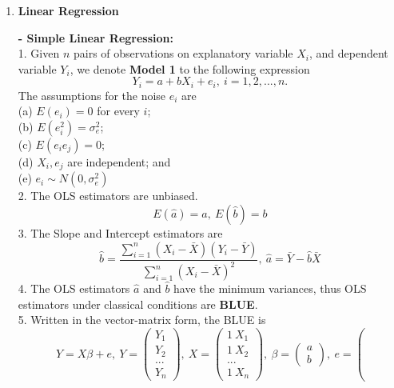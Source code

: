 \documentclass{article}
\begin{document}
\begin{enumerate}[S1 - ]
    \item \textbf{Linear Regression}\\\par
    \textbf{- Simple Linear Regression:}\\
    1. Given $n$ pairs of observations on explanatory variable $X_i$, and dependent variable $Y_i$, we denote \textbf{Model 1} to the following expression
    \begin{equation*}
    Y_i = a + bX_i +e_i, \ i=1,2,...,n.
    \end{equation*}
    The assumptions for the noise $e_i$ are\\
    (a) $E(e_i) = 0$ for every $i$;\\
    (b) $E(e_{i}^2) = \sigma_e^2$;\\
    (c) $E(e_ie_j) = 0$;\\
    (d) $X_i,e_j$ are independent; and\\
    (e) $e_i \sim N(0,\sigma_e^2)$\\
    2. The OLS estimators are unbiased.
    \begin{equation*}
    E(\hat{a}) = a, \ E(\hat{b}) = b
    \end{equation*}
    3. The Slope and Intercept estimators are
    \begin{equation*}
    \hat{b} = \frac{\sum_{i=1}^{n}(X_i-\bar{X})(Y_i-\bar{Y})}{\sum_{i=1}^{n}(X_i-\bar{X})^2}, \ \hat{a} = \bar{Y} -\hat{b}\bar{X}
    \end{equation*}
    4. The OLS estimators $\hat{a}$ and $\hat{b}$ have the minimum variances, thus OLS estimators under classical conditions are \textbf{BLUE}.\\
    5. Written in the vector-matrix form, the BLUE is
    \begin{equation*}
    Y = X\beta +e, \ Y = \left(
    \begin{array}{c}
    Y_1\\Y_2\\...\\Y_n
    \end{array}\right), \ X = \left(
    \begin{array}{c}
    1 \ X_1\\1 \ X_2\\...\\1 \ X_n
    \end{array}\right), \ \beta = \left(
    \begin{array}{c}
    a\\b\end{array}\right), \ e = \left(

\end{equation*}
\end{enumerate}
\end{document}
